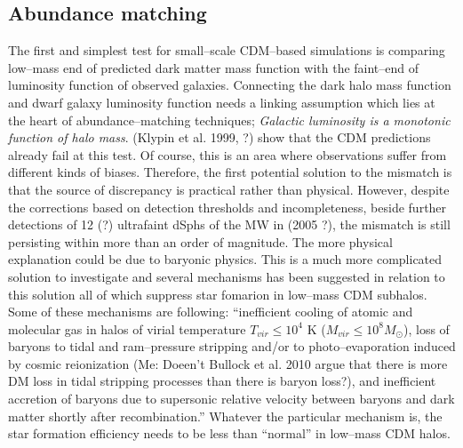 \documentclass[paper=a4, fontsize=11pt]{scrartcl} %
\numberwithin{equation}{section} %
\numberwithin{figure}{section} %
\numberwithin{table}{section} %
\begin{document}
\subsection{Abundance matching}
The first and simplest test for small--scale CDM--based simulations is comparing low--mass end of predicted dark matter mass function with the faint--end of luminosity function of observed galaxies. Connecting the dark halo mass function and dwarf galaxy luminosity function needs a linking assumption which lies at the heart of abundance--matching techniques; \emph{Galactic luminosity is a monotonic function of halo mass}. (Klypin et al. 1999, ?) show that the CDM predictions already fail at this test. Of course, this is an area where observations suffer from different kinds of biases. Therefore, the first potential solution to the mismatch is that the source of discrepancy is practical rather than physical. However, despite the corrections based on detection thresholds and incompleteness, beside further detections of 12 (?) ultrafaint dSphs of the MW in (2005 ?), the mismatch is still persisting within more than an order of magnitude. The more physical explanation could be due to baryonic physics. This is a much more complicated solution to investigate and several mechanisms has been suggested in relation to this solution all of which suppress star fomarion in low--mass CDM subhalos. Some of these mechanisms are following: ``inefficient cooling of atomic and molecular gas in halos of virial temperature $T_{vir} \leq 10^4$ K ($M_{vir} \leq 10^8 M_\odot$), loss of baryons to tidal and ram--pressure stripping and/or to photo--evaporation induced by cosmic reionization (Me: Doeen't Bullock et al. 2010 argue that there is more DM loss in tidal stripping processes than there is baryon loss?), and inefficient accretion of baryons due to supersonic relative velocity between baryons and dark matter shortly after recombination.'' Whatever the particular mechanism is, the star formation efficiency needs to be less than ``normal'' in low--mass CDM halos.
\end{document}
